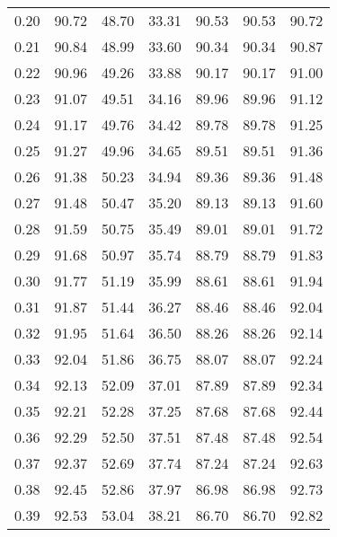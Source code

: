 \begin{tabular}{|c|c|c|c|c|c|c|}
      0.20 &     90.72 &     48.70 &      33.31 &   90.53 &      90.53 &         90.72 \\
      0.21 &     90.84 &     48.99 &      33.60 &   90.34 &      90.34 &         90.87 \\
      0.22 &     90.96 &     49.26 &      33.88 &   90.17 &      90.17 &         91.00 \\
      0.23 &     91.07 &     49.51 &      34.16 &   89.96 &      89.96 &         91.12 \\
      0.24 &     91.17 &     49.76 &      34.42 &   89.78 &      89.78 &         91.25 \\
      0.25 &     91.27 &     49.96 &      34.65 &   89.51 &      89.51 &         91.36 \\
      0.26 &     91.38 &     50.23 &      34.94 &   89.36 &      89.36 &         91.48 \\
      0.27 &     91.48 &     50.47 &      35.20 &   89.13 &      89.13 &         91.60 \\
      0.28 &     91.59 &     50.75 &      35.49 &   89.01 &      89.01 &         91.72 \\
      0.29 &     91.68 &     50.97 &      35.74 &   88.79 &      88.79 &         91.83 \\
      0.30 &     91.77 &     51.19 &      35.99 &   88.61 &      88.61 &         91.94 \\
      0.31 &     91.87 &     51.44 &      36.27 &   88.46 &      88.46 &         92.04 \\
      0.32 &     91.95 &     51.64 &      36.50 &   88.26 &      88.26 &         92.14 \\
      0.33 &     92.04 &     51.86 &      36.75 &   88.07 &      88.07 &         92.24 \\
      0.34 &     92.13 &     52.09 &      37.01 &   87.89 &      87.89 &         92.34 \\
      0.35 &     92.21 &     52.28 &      37.25 &   87.68 &      87.68 &         92.44 \\
      0.36 &     92.29 &     52.50 &      37.51 &   87.48 &      87.48 &         92.54 \\
      0.37 &     92.37 &     52.69 &      37.74 &   87.24 &      87.24 &         92.63 \\
      0.38 &     92.45 &     52.86 &      37.97 &   86.98 &      86.98 &         92.73 \\
      0.39 &     92.53 &     53.04 &      38.21 &   86.70 &      86.70 &         92.82 \\

\end{tabular}
